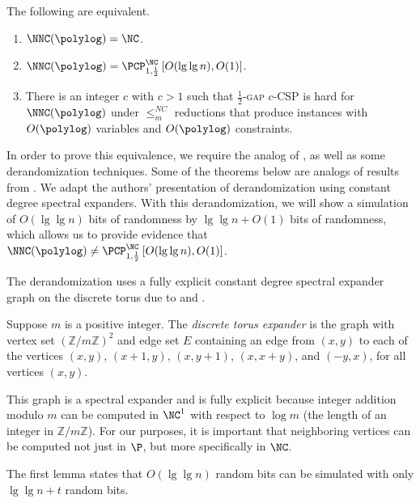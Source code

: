 \documentclass[]{article}
\newcommand{\PCPcs}[5]{\PCP^{#1}_{#2, #3}\left[#4, #5\right]}
\begin{document}
\begin{corollary}
  The following are equivalent.
  \begin{enumerate}
  \item $\NNC(\polylog) = \NC$.
  \item $\NNC(\polylog) = \PCPcs{\NC}{1}{\frac{1}{2}}{O(\lg \lg n)}{O(1)}$.
  \item There is an integer $c$ with $c > 1$ such that \textsc{$\frac{1}{2}$-gap $c$-CSP} is hard for $\NNC(\polylog)$ under $\leq_m^{NC}$ reductions that produce instances with $O(\polylog)$ variables and $O(\polylog)$ constraints.
  \end{enumerate}
\end{corollary}

In order to prove this equivalence, we require the \NC{} analog of , as well as some derandomization techniques.
Some of the theorems below are \NC{} analogs of results from \cite{fs96}.
We adapt the authors' presentation of derandomization using constant degree spectral expanders.
With this derandomization, we will show a simulation of $O(\lg \lg n)$ bits of randomness by $\lg \lg n + O(1)$ bits of randomness, which allows us to provide evidence that $\NNC(\polylog) \neq \PCPcs{\NC}{1}{\frac{1}{2}}{O(\lg \lg n)}{O(1)}$.

The derandomization uses a fully explicit constant degree spectral expander graph on the discrete torus due to \cite{margulis} and \cite{gg}.
\begin{construction}\label{con:expander}
  Suppose $m$ is a positive integer.
  The \emph{discrete torus expander} is the graph with vertex set ${(\mathbb{Z}/m\mathbb{Z})}^2$ and edge set $E$ containing an edge from $(x, y)$ to each of the vertices $(x, y)$, $(x + 1, y)$, $(x, y + 1)$, $(x, x + y)$, and $(-y, x)$, for all vertices $(x, y)$.
\end{construction}

This graph is a spectral expander \cite{gg} and is fully explicit because integer addition modulo $m$ can be computed in $\NC^1$ with respect to $\log m$ (the length of an integer in $\mathbb{Z}/m\mathbb{Z}$).
For our purposes, it is important that neighboring vertices can be computed not just in $\P$, but more specifically in $\NC$.

The first lemma states that $O(\lg \lg n)$ random bits can be simulated with only $\lg \lg n + t$ random bits.
\end{document}
